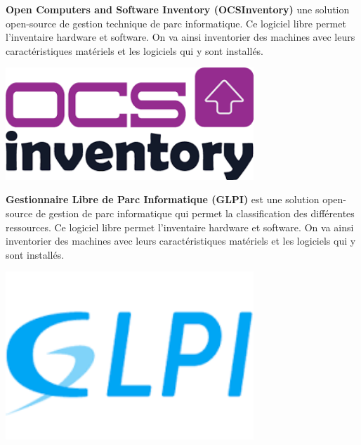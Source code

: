 \documentclass[12pt]{article}
\begin{document}
\noindent%
\begin{minipage}{.7\textwidth}%
\textbf{Open Computers and Software Inventory (\gls{OCSInventory})} une solution open-source de gestion technique de parc informatique. 
Ce logiciel libre permet l’inventaire hardware et software. 
On va ainsi inventorier des machines avec leurs caractéristiques matériels et les logiciels qui y sont installés.
\end{minipage}%
\hfill
\begin{minipage}{.3\textwidth}%
\begin{center}
\includegraphics[width=0.7\textwidth]{src/logo_ocsinventory.png}
\end{center}
\end{minipage}%

\noindent%
\begin{minipage}{.7\textwidth}%
\textbf{Gestionnaire Libre de Parc Informatique (\gls{GLPI})} est une solution open-source de gestion de parc informatique qui permet la classification des différentes ressources. 
Ce logiciel libre permet l’inventaire hardware et software. 
On va ainsi inventorier des machines avec leurs caractéristiques matériels et les logiciels qui y sont installés. \\
\end{minipage}%
\hfill
\begin{minipage}{.3\textwidth}%
\begin{center}
\includegraphics[width=0.7\textwidth]{src/logo_glpi.png} 
\end{center}
\end{minipage}%
\end{document}
